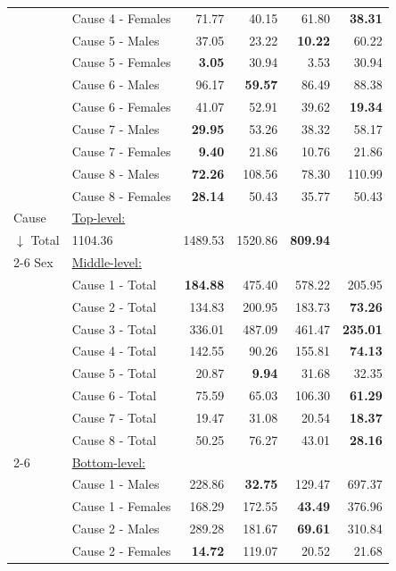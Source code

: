 \begin{center}
\begin{small}
\begin{longtable}{@{}llrrrr@{}}
& Cause 4 - Females & 71.77 & 40.15 & 61.80 & \textbf{38.31} \\
& Cause 5 - Males & 37.05 & 23.22 & \textbf{10.22} & 60.22 \\
& Cause 5 - Females & \textbf{3.05} & 30.94 & 3.53 & 30.94 \\
& Cause 6 - Males & 96.17 & \textbf{59.57} & 86.49 & 88.38 \\
& Cause 6 - Females & 41.07 & 52.91 & 39.62 & \textbf{19.34} \\
& Cause 7 - Males & \textbf{29.95} & 53.26 & 38.32 & 58.17 \\
& Cause 7 - Females & \textbf{9.40} & 21.86 & 10.76 & 21.86 \\
& Cause 8 - Males & \textbf{72.26} & 108.56 & 78.30 & 110.99 \\
& Cause 8 - Females & \textbf{28.14} & 50.43 & 35.77 & 50.43 \\
\midrule
Cause & \multicolumn{5}{l}{\underline{Top-level:}}\\
$\downarrow$  Total & 1104.36 & 1489.53 & 1520.86 & \textbf{809.94} \\
\cmidrule{2-6}
Sex & \multicolumn{5}{l}{\underline{Middle-level:}}\\
& Cause 1 - Total & \textbf{184.88} & 475.40 & 578.22 & 205.95 \\
& Cause 2 - Total & 134.83 & 200.95 & 183.73 & \textbf{73.26} \\
& Cause 3 - Total & 336.01 & 487.09 & 461.47 & \textbf{235.01} \\
& Cause 4 - Total & 142.55 & 90.26 & 155.81 & \textbf{74.13} \\
& Cause 5 - Total & 20.87 & \textbf{9.94} & 31.68 & 32.35 \\
& Cause 6 - Total & 75.59 & 65.03 & 106.30 & \textbf{61.29} \\
& Cause 7 - Total & 19.47 & 31.08 & 20.54 & \textbf{18.37} \\
& Cause 8 - Total & 50.25 & 76.27 & 43.01 & \textbf{28.16} \\
\cmidrule{2-6}
& \multicolumn{5}{l}{\underline{Bottom-level:}}\\
& Cause 1 - Males & 228.86 & \textbf{32.75} & 129.47 & 697.37 \\
& Cause 1 - Females & 168.29 & 172.55 & \textbf{43.49} & 376.96 \\
& Cause 2 - Males & 289.28 & 181.67 & \textbf{69.61} & 310.84 \\
& Cause 2 - Females & \textbf{14.72} & 119.07 & 20.52 & 21.68 \\

\end{longtable}
\end{small}
\end{center}
